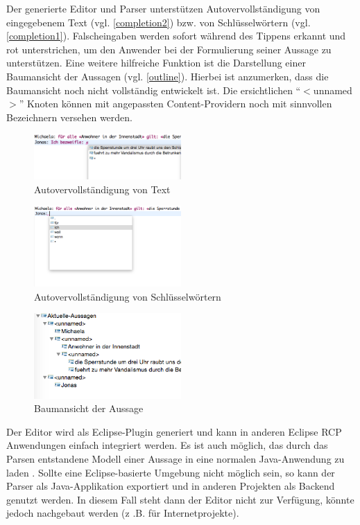 \documentclass[11pt,a4paper,bibtotocnumbered]{scrreprt}
\begin{document}
Der generierte Editor und Parser unterstützen Autovervollständigung von eingegebenem Text (vgl. \autoref{completion2}) bzw. von Schlüsselwörtern (vgl. \autoref{completion1}).
Falscheingaben werden sofort während des Tippens erkannt und rot unterstrichen, um den Anwender bei der Formulierung seiner Aussage zu unterstützen.
Eine weitere hilfreiche Funktion ist die Darstellung einer Baumansicht der Aussagen (vgl. \autoref{outline}).
Hierbei ist anzumerken, dass die Baumansicht noch nicht vollständig entwickelt ist.
Die ersichtlichen \enquote{$<$unnamed$>$} Knoten können mit angepassten Content-Providern noch mit sinnvollen Bezeichnern versehen werden.

\begin{figure}
\centering
\includegraphics[width=0.5\textwidth]{img/completion2.png}
\caption{Autovervollständigung von Text}
\label{completion2}
\end{figure}

\begin{figure}
\centering
\includegraphics[width=0.5\textwidth]{img/completion1.png}
\caption{Autovervollständigung von Schlüsselwörtern}
\label{completion1}
\end{figure}

\begin{figure}
\centering
\includegraphics[width=0.5\textwidth]{img/outline.png}
\caption{Baumansicht der Aussage}
\label{outline}
\end{figure}

Der Editor wird als Eclipse-Plugin generiert und kann in anderen Eclipse RCP Anwendungen einfach integriert werden.
Es ist auch möglich, das durch das Parsen entstandene Modell einer Aussage in eine normalen Java-Anwendung zu laden \cite{XtextLoadJava}.
Sollte eine Eclipse-basierte Umgebung nicht möglich sein, so kann der Parser als Java-Applikation exportiert und in anderen Projekten als Backend genutzt werden.
In diesem Fall steht dann der Editor nicht zur Verfügung, könnte jedoch nachgebaut werden (z .B. für Internetprojekte).
\end{document}
